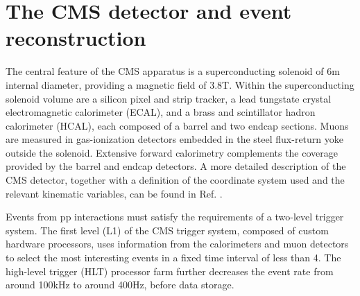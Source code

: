 \section{The CMS detector and event reconstruction}
\label{sect:CMSRec}
The central feature of the CMS apparatus is a superconducting solenoid of 6\unit{m} internal diameter, providing a magnetic field of 3.8\unit{T}. Within the superconducting solenoid volume are a silicon pixel and strip tracker, a lead tungstate crystal electromagnetic calorimeter (ECAL), and a brass and scintillator hadron calorimeter (HCAL), each composed of a barrel and two endcap sections. Muons are measured in gas-ionization detectors embedded in the steel flux-return yoke outside the solenoid. Extensive forward calorimetry complements the coverage provided by the barrel and endcap detectors. 
A more detailed description of the CMS detector, together with a definition of the coordinate system used and the relevant kinematic variables, can be found in Ref. \cite{Chatrchyan:2008zzk}.


Events from pp interactions must satisfy the requirements of a two-level trigger system.
The first level (L1) of the CMS trigger system, composed of custom hardware processors, uses information from the calorimeters and muon detectors to select the most interesting events in a fixed time interval of less than 4\mus. The high-level trigger (HLT) processor farm further decreases the event rate from around 100\unit{kHz} to around 400\unit{Hz}, before data storage. 

